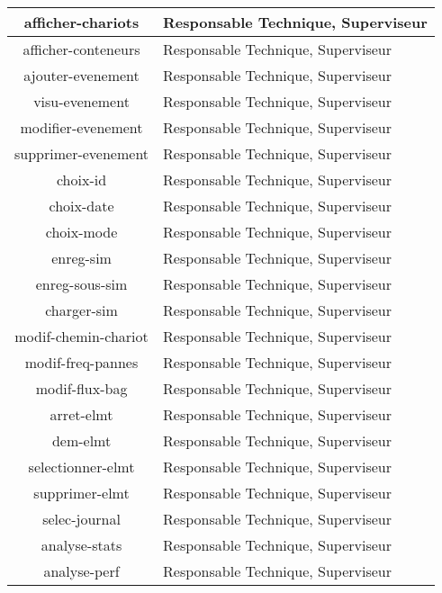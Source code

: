 \begin{center}
\begin{tabular}{|c|p{10cm}|}
	afficher-chariots  & {\centering  Responsable Technique, Superviseur }\\ \hline
	afficher-conteneurs  & {\centering  Responsable Technique, Superviseur }\\ \hline
	ajouter-evenement  & {\centering  Responsable Technique, Superviseur }\\ \hline
	visu-evenement  & {\centering  Responsable Technique, Superviseur }\\ \hline
	modifier-evenement  & {\centering  Responsable Technique, Superviseur }\\ \hline
	supprimer-evenement  & {\centering  Responsable Technique, Superviseur }\\ \hline
	choix-id  & {\centering  Responsable Technique, Superviseur }\\ \hline
	choix-date  & {\centering  Responsable Technique, Superviseur }\\ \hline
	choix-mode  & {\centering  Responsable Technique, Superviseur }\\ \hline
	enreg-sim  & {\centering  Responsable Technique, Superviseur }\\ \hline
	enreg-sous-sim  & {\centering  Responsable Technique, Superviseur }\\ \hline
	charger-sim  & {\centering  Responsable Technique, Superviseur }\\ \hline
	modif-chemin-chariot  & {\centering  Responsable Technique, Superviseur }\\ \hline
	modif-freq-pannes  & {\centering  Responsable Technique, Superviseur }\\ \hline
	modif-flux-bag  & {\centering  Responsable Technique, Superviseur }\\ \hline
	arret-elmt  & {\centering  Responsable Technique, Superviseur }\\ \hline
	dem-elmt  & {\centering  Responsable Technique, Superviseur }\\ \hline
	selectionner-elmt  & {\centering  Responsable Technique, Superviseur }\\ \hline
	supprimer-elmt  & {\centering  Responsable Technique, Superviseur }\\ \hline
	selec-journal  & {\centering  Responsable Technique, Superviseur }\\ \hline
	analyse-stats  & {\centering  Responsable Technique, Superviseur }\\ \hline
	analyse-perf  & {\centering  Responsable Technique, Superviseur }\\ \hline
\end{tabular}
\end{center}
